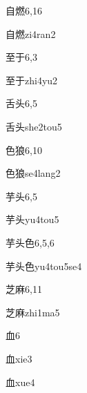 \begin{entry}{自燃}{6,16}
  \begin{phonetics}{自燃}{zi4ran2}
  \end{phonetics}
\end{entry}

\begin{entry}{至于}{6,3}
  \begin{phonetics}{至于}{zhi4yu2}
  \end{phonetics}
\end{entry}

\begin{entry}{舌头}{6,5}
  \begin{phonetics}{舌头}{she2tou5}
  \end{phonetics}
\end{entry}

\begin{entry}{色狼}{6,10}
  \begin{phonetics}{色狼}{se4lang2}
  \end{phonetics}
\end{entry}

\begin{entry}{芋头}{6,5}
  \begin{phonetics}{芋头}{yu4tou5}
  \end{phonetics}
\end{entry}

\begin{entry}{芋头色}{6,5,6}
  \begin{phonetics}{芋头色}{yu4tou5se4}
  \end{phonetics}
\end{entry}

\begin{entry}{芝麻}{6,11}
  \begin{phonetics}{芝麻}{zhi1ma5}
  \end{phonetics}
\end{entry}

\begin{entry}{血}{6}
  \begin{phonetics}{血}{xie3}
  \end{phonetics}
  \begin{phonetics}{血}{xue4}
  \end{phonetics}
\end{entry}

